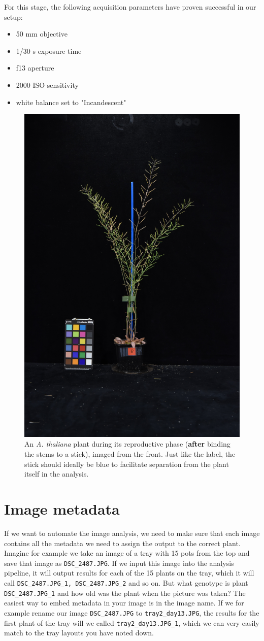 \documentclass[10pt]{article}
\begin{document}
 	\noindent For this stage, the following acquisition parameters have proven successful in our setup:
 	
 	\begin{itemize}
 		\item 50 mm objective
 		\item 1/30 s exposure time
 		\item f13 aperture
 		\item 2000 ISO sensitivity
 		\item white balance set to "Incandescent"
 	\end{itemize}
 
	 \begin{figure}[!h]
	 	\centering
	 	\includegraphics[width=0.3\linewidth]{20201029_8}
	 	\caption[Example image of a front-view image.]{An \textit{A. thaliana} plant during its reproductive phase (\textbf{after} binding the stems to a stick), imaged from the front. Just like the label, the stick should ideally be blue to facilitate separation from the plant itself in the analysis.}
	 	\label{fig:front_after}
	 \end{figure}
 
 \section{Image metadata\label{prep}}
 
 If we want to automate the image analysis, we need to make sure that each image contains all the metadata we need to assign the output to the correct plant. Imagine for example we take an image of a tray with 15 pots from the top and save that image as \texttt{DSC\_2487.JPG}. If we input this image into the analysis pipeline, it will output results for each of the 15 plants on the tray, which it will call \texttt{DSC\_2487.JPG\_1, DSC\_2487.JPG\_2} and so on. But what genotype is plant \texttt{DSC\_2487.JPG\_1} and how old was the plant when the picture was taken? The easiest way to embed metadata in your image is in the image name. If we for example rename our image \texttt{DSC\_2487.JPG} to \texttt{tray2\_day13.JPG}, the results for the first plant of the tray will we called \texttt{tray2\_day13.JPG\_1}, which we can very easily match to the tray layouts you have noted down. 
 
\end{document}
